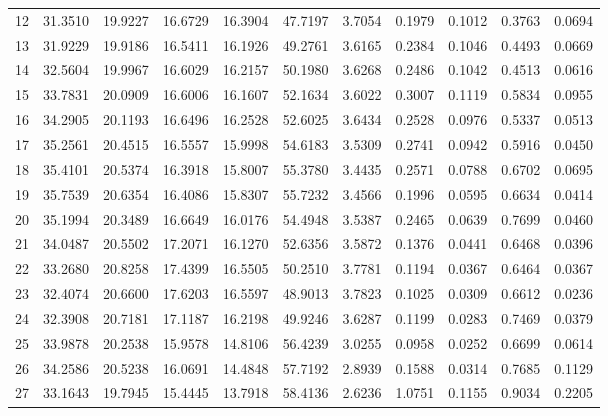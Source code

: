 \begin{table}[!htbp]
\begin{tabular}{rrrrrrrrrrr}
12 & 31.3510 & 19.9227 & 16.6729 & 16.3904 & 47.7197 & 3.7054 & 0.1979 & 0.1012 & 0.3763 & 0.0694 \\
13 & 31.9229 & 19.9186 & 16.5411 & 16.1926 & 49.2761 & 3.6165 & 0.2384 & 0.1046 & 0.4493 & 0.0669 \\
14 & 32.5604 & 19.9967 & 16.6029 & 16.2157 & 50.1980 & 3.6268 & 0.2486 & 0.1042 & 0.4513 & 0.0616 \\
15 & 33.7831 & 20.0909 & 16.6006 & 16.1607 & 52.1634 & 3.6022 & 0.3007 & 0.1119 & 0.5834 & 0.0955 \\
16 & 34.2905 & 20.1193 & 16.6496 & 16.2528 & 52.6025 & 3.6434 & 0.2528 & 0.0976 & 0.5337 & 0.0513 \\
17 & 35.2561 & 20.4515 & 16.5557 & 15.9998 & 54.6183 & 3.5309 & 0.2741 & 0.0942 & 0.5916 & 0.0450 \\
18 & 35.4101 & 20.5374 & 16.3918 & 15.8007 & 55.3780 & 3.4435 & 0.2571 & 0.0788 & 0.6702 & 0.0695 \\
19 & 35.7539 & 20.6354 & 16.4086 & 15.8307 & 55.7232 & 3.4566 & 0.1996 & 0.0595 & 0.6634 & 0.0414 \\
20 & 35.1994 & 20.3489 & 16.6649 & 16.0176 & 54.4948 & 3.5387 & 0.2465 & 0.0639 & 0.7699 & 0.0460 \\
21 & 34.0487 & 20.5502 & 17.2071 & 16.1270 & 52.6356 & 3.5872 & 0.1376 & 0.0441 & 0.6468 & 0.0396 \\
22 & 33.2680 & 20.8258 & 17.4399 & 16.5505 & 50.2510 & 3.7781 & 0.1194 & 0.0367 & 0.6464 & 0.0367 \\
23 & 32.4074 & 20.6600 & 17.6203 & 16.5597 & 48.9013 & 3.7823 & 0.1025 & 0.0309 & 0.6612 & 0.0236 \\
24 & 32.3908 & 20.7181 & 17.1187 & 16.2198 & 49.9246 & 3.6287 & 0.1199 & 0.0283 & 0.7469 & 0.0379 \\
25 & 33.9878 & 20.2538 & 15.9578 & 14.8106 & 56.4239 & 3.0255 & 0.0958 & 0.0252 & 0.6699 & 0.0614 \\
26 & 34.2586 & 20.5238 & 16.0691 & 14.4848 & 57.7192 & 2.8939 & 0.1588 & 0.0314 & 0.7685 & 0.1129 \\
27 & 33.1643 & 19.7945 & 15.4445 & 13.7918 & 58.4136 & 2.6236 & 1.0751 & 0.1155 & 0.9034 & 0.2205 \\
\bottomrule
\end{tabular}
\end{table}
